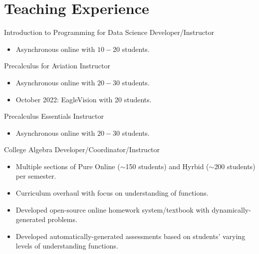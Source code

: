 \documentclass[10pt,a4paper,sans]{moderncv}
\begin{document}
\section{Teaching Experience} 
{Introduction to Programming for Data Science}
{Developer/Instructor}{}{}
{\begin{itemize}
		\item Asynchronous online with $10-20$ students.
\end{itemize} }
	{Precalculus for Aviation}
	{Instructor}{}{}
	{\begin{itemize}
			\item Asynchronous online with $20-30$ students.
			\item October 2022: EagleVision with 20 students.
		\end{itemize} }
	{Precalculus Essentials}
	{Instructor}{}{}
	{\begin{itemize}
			\item Asynchronous online with $20-30$ students.
	\end{itemize} }
{College Algebra}
{Developer/Coordinator/Instructor}{}{}
{\begin{itemize}
		\item Multiple sections of Pure Online ($\sim$150 students) and Hyrbid ($\sim$200 students) per semester. 
		\item Curriculum overhaul with focus on understanding of functions.
		\item Developed open-source online homework system/textbook with dynamically-generated problems.
		\item Developed automatically-generated assessments based on students' varying levels of understanding functions.
\end{itemize}}
\end{document}
